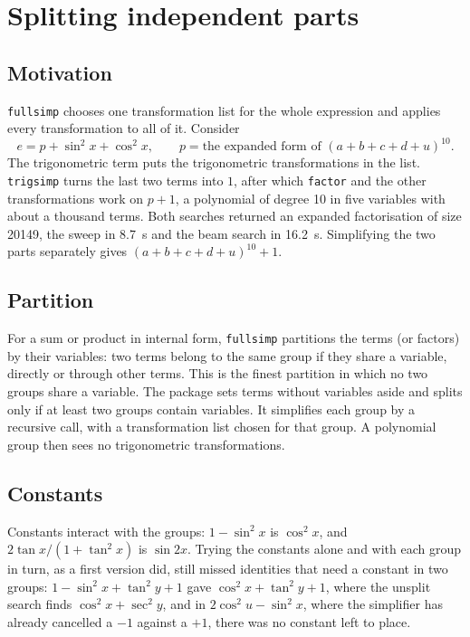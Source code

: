 \documentclass[11pt]{amsart}
\newcommand{\mx}{\lstinline[style=mx]}
\theoremstyle{definition}
\theoremstyle{remark}
\begin{document}
\section{Splitting independent parts}\label{sec:split}

\subsection{Motivation}

\texttt{fullsimp} chooses one transformation list for the whole expression
and applies every transformation to all of it. Consider
\[
  e = p + \sin^2 x + \cos^2 x, \qquad p = \text{the expanded form of } (a+b+c+d+u)^{10}.
\]
The trigonometric term puts the trigonometric transformations in the list.
\mx|trigsimp| turns the last two terms into $1$, after which \mx|factor| and
the other transformations work on $p + 1$, a polynomial of degree 10 in five
variables with about a thousand terms. Both searches returned an expanded
factorisation of size 20149, the sweep in 8.7~s and the beam search in
16.2~s. Simplifying the two parts separately gives $(a+b+c+d+u)^{10} + 1$.

\subsection{Partition}

For a sum or product in internal form, \texttt{fullsimp} partitions the terms
(or factors) by their variables: two terms belong to the same group if they
share a variable, directly or through other terms. This is the finest
partition in which no two groups share a variable. The package sets terms
without variables aside and splits only if at least two groups contain
variables. It simplifies each group by a recursive call, with a
transformation list chosen for that group. A polynomial group then sees no
trigonometric transformations.

\subsection{Constants}

Constants interact with the groups: $1 - \sin^2 x$ is $\cos^2 x$, and
$2\tan x/(1 + \tan^2 x)$ is $\sin 2x$. Trying the constants alone and with
each group in turn, as a first version did, still missed identities that
need a constant in two groups: $1 - \sin^2 x + \tan^2 y +
1$ gave $\cos^2 x + \tan^2 y + 1$, where the unsplit search finds $\cos^2
x + \sec^2 y$, and in $2\cos^2 u - \sin^2 x$, where the simplifier has
already cancelled a $-1$ against a $+1$, there was no constant left to
place.
\end{document}

